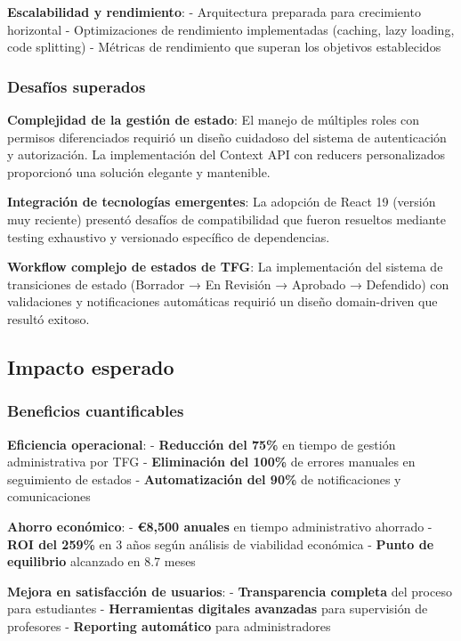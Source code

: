 \documentclass[12pt,a4paper,oneside]{report}
\begin{document}
\textbf{Escalabilidad y rendimiento}: - Arquitectura preparada para
crecimiento horizontal - Optimizaciones de rendimiento implementadas
(caching, lazy loading, code splitting) - Métricas de rendimiento que
superan los objetivos establecidos

\subsubsection{Desafíos superados}\label{desafuxedos-superados}

\textbf{Complejidad de la gestión de estado}: El manejo de múltiples
roles con permisos diferenciados requirió un diseño cuidadoso del
sistema de autenticación y autorización. La implementación del Context
API con reducers personalizados proporcionó una solución elegante y
mantenible.

\textbf{Integración de tecnologías emergentes}: La adopción de React 19
(versión muy reciente) presentó desafíos de compatibilidad que fueron
resueltos mediante testing exhaustivo y versionado específico de
dependencias.

\textbf{Workflow complejo de estados de TFG}: La implementación del
sistema de transiciones de estado (Borrador → En Revisión → Aprobado →
Defendido) con validaciones y notificaciones automáticas requirió un
diseño domain-driven que resultó exitoso.

\subsection{Impacto esperado}\label{impacto-esperado}

\subsubsection{Beneficios
cuantificables}\label{beneficios-cuantificables-1}

\textbf{Eficiencia operacional}: - \textbf{Reducción del 75\%} en tiempo
de gestión administrativa por TFG - \textbf{Eliminación del 100\%} de
errores manuales en seguimiento de estados - \textbf{Automatización del
90\%} de notificaciones y comunicaciones

\textbf{Ahorro económico}: - \textbf{€8,500 anuales} en tiempo
administrativo ahorrado - \textbf{ROI del 259\%} en 3 años según
análisis de viabilidad económica - \textbf{Punto de equilibrio}
alcanzado en 8.7 meses

\textbf{Mejora en satisfacción de usuarios}: - \textbf{Transparencia
completa} del proceso para estudiantes - \textbf{Herramientas digitales
avanzadas} para supervisión de profesores - \textbf{Reporting
automático} para administradores
\end{document}
